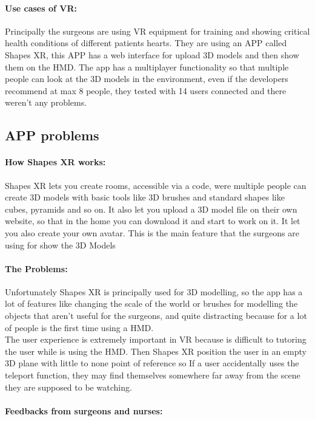 \paragraph{Use cases of VR:}
Principally the surgeons are using VR equipment for training and showing critical health conditions of different patients hearts.
They are using an APP called Shapes XR, this APP has a web interface for upload 3D models and then show them on the \ac{HMD}.
The app has a multiplayer functionality so that multiple people can look at the 3D models in the environment, even if the developers recommend at max 8 people, they tested with 14 users connected and there weren't any problems.

\subsection{APP problems}

\paragraph{How Shapes XR works:}
Shapes XR lets you create rooms, accessible via a code, were multiple people can create 3D models with basic tools like 3D brushes and standard shapes like cubes, pyramids and so on.
It also let you upload a 3D model file on their own website, so that in the home you can download it and start to work on it.
It let you also create your own avatar.
This is the main feature that the surgeons are using for show the 3D Models

\paragraph{The Problems:}
Unfortunately Shapes XR is principally used for 3D modelling, so the app has a lot of features like changing the scale of the world or brushes for modelling the objects that aren't useful for the surgeons,
and quite distracting because for a lot of people is the first time using a \ac{HMD}.\\
The user experience is extremely important in \ac{VR} because is difficult to tutoring the user while is using the \ac{HMD}.
Then Shapes XR position the user in an empty 3D plane with little to none point of reference so If a user accidentally uses the teleport function, they may find themselves somewhere far away from the scene they are supposed to be watching.

\paragraph{Feedbacks from surgeons and nurses:}

